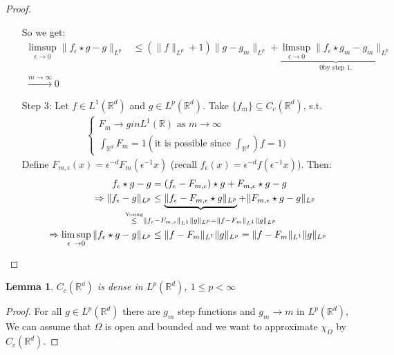 \documentclass{report}
\theoremstyle{tommy}
\newtheorem{lem}[defn]{Lemma}
\begin{document}
\begin{proof}
\begin{itemize}
      So we get:
      \begin{align*}
        \limsup_{\epsilon \to 0} \|f_\epsilon \star g - g\|_{L^p} 
        &\le (\|f\|_{L^p} + 1) \|g - g_m\|_{L^p} + \underbrace{\limsup_{\epsilon \to 0} \|f_\epsilon \star g_m - g_m\|_{L^p}}_{0 \text{by step 1.}} \\
        \xrightarrow{m \to \infty} 0
      \end{align*}
      \item[Step 3:] Let \(f \in L^1(\mathbb{R}^d)\) and \(g \in L^p(\mathbb{R}^d)\). Take \(\{f_m\} \subseteq C_c(\mathbb{R}^d)\), s.t. 
      \begin{align*}
        \begin{cases}
          F_m \to g in L^1(\mathbb{R}) \text{ as } m \to \infty \\
          \int_{\mathbb{R}^d} F_m = 1 (\text{it is possible since } \int_{\mathbb{R}^d}) f = 1)
        \end{cases}
      \end{align*} 
      Define \(F_{m, \epsilon}(x) = \epsilon^{-d} F_m(\epsilon^{-1} x)\) (recall \(f_\epsilon(x) = \epsilon^{-d} f(\epsilon^{-1} x)\)). Then:
      \begin{align*}
        f_\epsilon \star g - g &= (f_\epsilon - F_{m, \epsilon}) \star g + F_{m, \epsilon} \star g -g \\
        \Rightarrow \|f_\epsilon - g \|_{L^p} &\le \underbrace{\|f_\epsilon - F_{m, \epsilon} \star g\|_{L^p}}_{\mathclap{\overset{\text{Young}}{\le} \|f_\epsilon - F_{m, \epsilon}\|_{L^1} \|g\|_{L^p} = \|f - F_m\|_{L^1} \|g\|_{L^p}}} + \|F_{m, \epsilon} \star g - g\|_{L^p} \\
        \Rightarrow \limsup_{\epsilon \to 0} \|f_\epsilon \star g - g\|_{L^p} &\le \|f - F_m\|_{L^1} \|g\|_{L^p} = \|f - F_m\|_{L^1} \|g \|_{L^p}
      \end{align*}
    \end{itemize}
  \end{proof}

  
  \begin{lem}
    \(C_c(\mathbb{{R}^d})\) is dense in \(L^p(\mathbb{R}^d)\), \(1 \le p < \infty\)
  \end{lem}

  \begin{proof}
    For all \(g \in L^p(\mathbb{R}^d)\) there are \(g_m\) step functions and \(g_m \to m\) in \(L^p(\mathbb{R}^d)\),
    We can assume that \(\Omega\) is open and bounded and we want to approximate \(\chi_\Omega\) by \(C_c(\mathbb{R}^d)\). 
  \end{proof}
\end{document}
